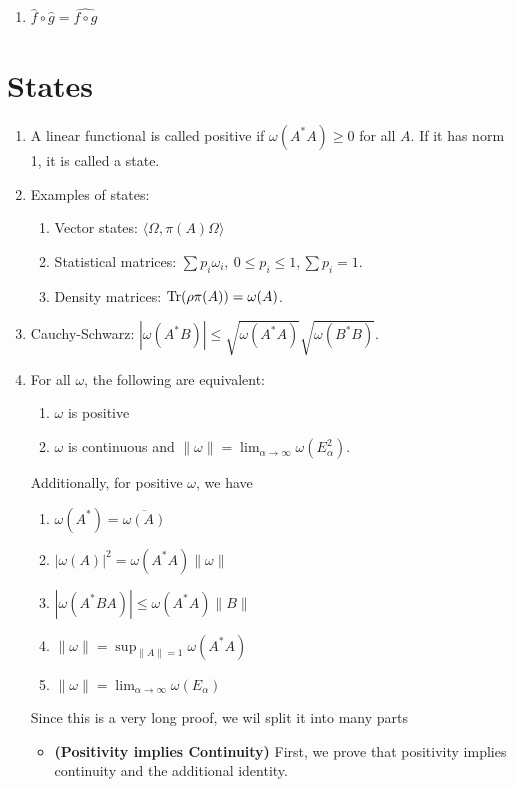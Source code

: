 \documentclass[twoside,symmetric, openany, 12pt]{./tuftebook}
\theoremstyle{definition}
\theoremstyle{definition}
\theoremstyle{definition}
\begin{document}
\begin{enumerate}
		If $\lambda \not\in \sigma(A)$, then $h_1=(\lambda - f(z))^{-1}$ is holomorphic on a neighbourhood of $\sigma(A)$. Then $\hat{h}_1(A)$ is an inverse of $\lambda\mathbbm{1}-f(\hat{A})$.

		If $\lambda\in f(\sigma(A))$, we define $\lambda=f(z_0)$ and there exists a $h_2$ holomorphic on a neighbourhood of $\sigma(A)$ with $\lambda-f(z)=f(z_0)-f(z)=(z_0-z)h_2(z)$. Hence, $\lambda\mathbbm{1}-\hat{f}(A)=(z_0\mathbbm{1}-A)\hat{h}_2(A)$.
	\item $\hat{f}\circ \hat{g} = \widehat{f\circ g}$
\end{enumerate}
\section{States}
\begin{enumerate}
	\item A linear functional is called positive if $\omega(A^*A)\ge 0$ for all $A$. If it has norm 1, it is called a state.
	\item Examples of states:
		\begin{enumerate}
			\item Vector states: $\langle \Omega, \pi(A)\Omega\rangle$ 
			\item Statistical matrices: $\sum p_i\omega_i,~0\le p_i\le 1, \sum p_i = 1$.
			\item Density matrices: $\Tr(\rho\pi(A))=\omega(A)$.
		\end{enumerate}
	\item Cauchy-Schwarz: $|\omega(A^*B)| \le \sqrt{\omega(A^* A)} \sqrt{\omega(B^* B)} $.
	\item For all $\omega$, the following are equivalent:
		\begin{enumerate}
			\item $\omega$ is positive
			\item $\omega$ is continuous and $\|\omega\|=\lim_{\alpha \to \infty} \omega(E_\alpha^2)$.
		\end{enumerate}
		Additionally, for positive $\omega$, we have
		\begin{enumerate}
			\item $\omega(A^*)=\overline{\omega(A)}$ 
			\item $|\omega(A)|^2 = \omega(A^* A)\|\omega\|$ 
			\item $|\omega(A^*BA)|\le \omega(A^*A)\|B\|$ 
			\item $\|\omega\|=\sup_{\|A\|=1}\omega(A^* A)$ 
			\item $\|\omega\|=\lim_{\alpha \to \infty} \omega(E_\alpha)$
		\end{enumerate}
		Since this is a very long proof, we wil split it into many parts
		\begin{itemize}
			\item \textbf{(Positivity implies Continuity)} First, we prove that positivity implies continuity and the additional identity.


\end{itemize}
\end{enumerate}
\end{document}
